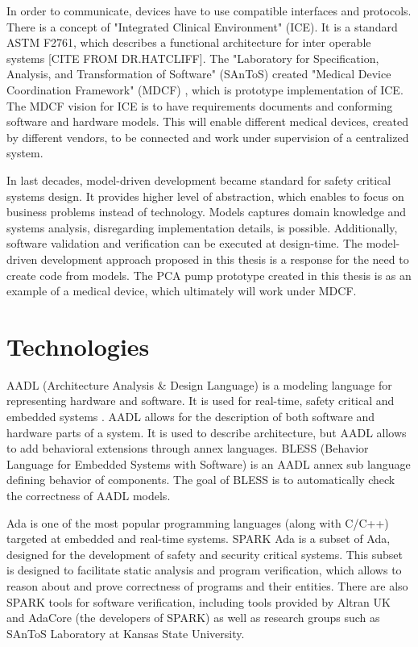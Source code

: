 In order to communicate, devices have to use compatible interfaces and protocols. There is a concept of "Integrated Clinical Environment" (ICE). It is a standard ASTM F2761, which describes a functional architecture for inter operable systems [CITE FROM DR.HATCLIFF]. The "Laboratory for Specification, Analysis, and Transformation of Software" (SAnToS) created "Medical Device Coordination Framework" (MDCF) \cite{MDCF:Paper}, which is prototype implementation of ICE. The MDCF vision for ICE is to have requirements documents and conforming software and hardware models. This will enable different medical devices, created by different vendors, to be connected and work under supervision of a centralized system.

In last decades, model-driven development \cite{ModelDrivenDevelopmentBook} became standard for safety critical systems design. It provides higher level of abstraction, which enables to focus on business problems instead of technology. Models captures domain knowledge and systems analysis, disregarding implementation details, is possible. Additionally, software validation and verification can be executed at design-time. The model-driven development approach proposed in this thesis is a response for the need to create code from models. The PCA pump prototype created in this thesis is as an example of a medical device, which ultimately will work under MDCF.


\section{Technologies}
\label{introduction:technologies}

AADL (Architecture Analysis \& Design Language) \cite{AadlBook} is a modeling language for representing hardware and software. It is used for real-time, safety critical and embedded systems \cite{AADL:Paper}. AADL allows for the description of both software and hardware parts of a system. It is used to describe architecture, but AADL allows to add behavioral extensions through annex languages. BLESS (Behavior Language for Embedded Systems with Software) \cite{Bless:Paper} is an AADL annex sub language defining behavior of components. The goal of BLESS is to automatically check the correctness of AADL models.

Ada is one of the most popular programming languages (along with C/C++) targeted at embedded and real-time systems. SPARK Ada \cite{Barnes:Book} is a subset of Ada, designed for the development of safety and security critical systems. This subset is designed to facilitate static analysis and program verification, which allows to reason about and prove correctness of programs and their entities. There are also SPARK tools for software verification, including tools provided by Altran UK and AdaCore (the developers of SPARK) as well as research groups such as SAnToS Laboratory at Kansas State University.


